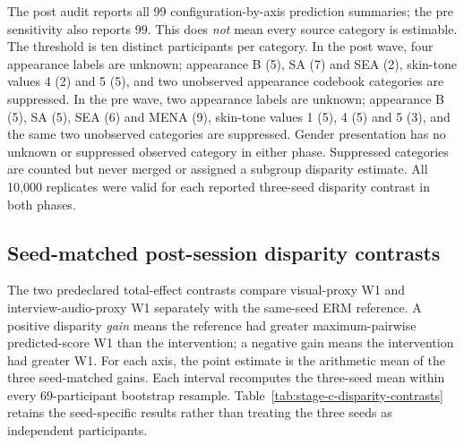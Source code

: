 The post audit reports all 99 configuration-by-axis prediction summaries; the pre sensitivity
also reports 99. This does \emph{not} mean every source category is estimable.
The threshold is ten distinct participants per category. In the post wave, four appearance
labels are unknown; appearance B (5), SA (7) and SEA (2), skin-tone values 4 (2) and 5 (5),
and two unobserved appearance codebook categories are suppressed. In the pre wave, two
appearance labels are unknown; appearance B (5), SA (5), SEA (6) and MENA (9), skin-tone values
1 (5), 4 (5) and 5 (3), and the same two unobserved categories are suppressed. Gender
presentation has no unknown or suppressed observed category in either phase. Suppressed
categories are counted but never merged or assigned a subgroup disparity estimate.
All 10,000 replicates were valid for each reported three-seed disparity contrast in both phases.

\subsection{Seed-matched post-session disparity contrasts}

The two predeclared total-effect contrasts compare visual-proxy W1 and interview-audio-proxy W1
separately with the same-seed ERM reference. A positive disparity \emph{gain} means the reference
had greater maximum-pairwise predicted-score W1 than the intervention; a negative gain means
the intervention had greater W1. For each axis, the point estimate is the arithmetic mean of
the three seed-matched gains. Each interval recomputes the three-seed mean within every
69-participant bootstrap resample. Table~\ref{tab:stage-c-disparity-contrasts} retains the
seed-specific results rather than treating the three seeds as independent participants.

